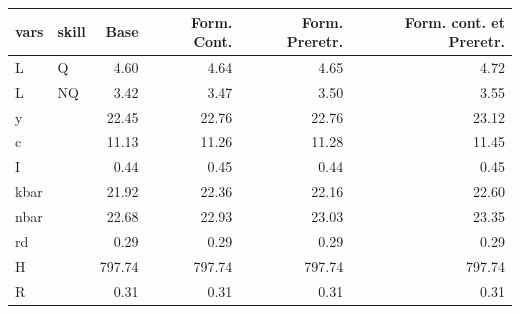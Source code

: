 \begin{tabular}{llrrrr}
  \hline
vars & skill & Base & Form. Cont. & Form. Preretr. & Form. cont. et Preretr. \\ 
  \hline
L & Q & 4.60 & 4.64 & 4.65 & 4.72 \\ 
  L & NQ & 3.42 & 3.47 & 3.50 & 3.55 \\ 
  y &  & 22.45 & 22.76 & 22.76 & 23.12 \\ 
  c &  & 11.13 & 11.26 & 11.28 & 11.45 \\ 
  I &  & 0.44 & 0.45 & 0.44 & 0.45 \\ 
  kbar &  & 21.92 & 22.36 & 22.16 & 22.60 \\ 
  nbar &  & 22.68 & 22.93 & 23.03 & 23.35 \\ 
  rd &  & 0.29 & 0.29 & 0.29 & 0.29 \\ 
  H &  & 797.74 & 797.74 & 797.74 & 797.74 \\ 
  R &  & 0.31 & 0.31 & 0.31 & 0.31 \\ 
   \hline
\end{tabular}

